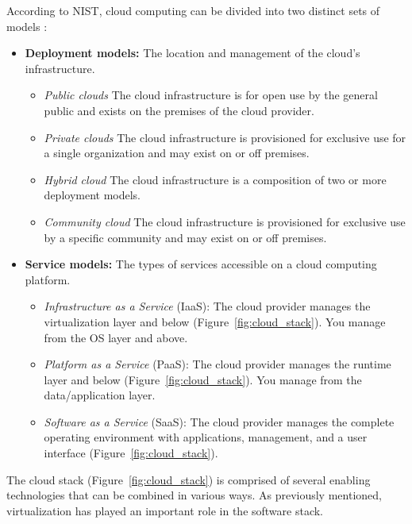 \noindent
According to NIST, cloud computing can be divided into two distinct sets of models \cite[p. 2-3]{nist2011definition}:
\begin{itemize}
    \item \textbf{Deployment models:} The location and management of the cloud's infrastructure. 
        \begin{itemize}
            \setlength\itemsep{0.05em}
            \vspace{-3mm}
            \item \textit{Public clouds} The cloud infrastructure is for open use by the general public and exists on the premises of the cloud provider.
            \item \textit{Private clouds} The cloud infrastructure is provisioned for exclusive use for a single organization and may exist on or off premises.
            \item \textit{Hybrid cloud} The cloud infrastructure is a composition of two or more deployment models.
            \item \textit{Community cloud} The cloud infrastructure is provisioned for exclusive use by a specific community and may exist on or off premises.
        \end{itemize}
    \item \textbf{Service models:} The types of services accessible on a cloud computing platform.
        \begin{itemize}
            \setlength\itemsep{0.05em}
            \vspace{-3mm}
            \item \textit{Infrastructure as a Service} (IaaS): The cloud provider manages the virtualization layer and below (Figure~\ref{fig:cloud_stack}). You manage from the OS layer and above.
            \item \textit{Platform as a Service} (PaaS): The cloud provider manages the runtime layer and below (Figure~\ref{fig:cloud_stack}). You manage from the data/application layer.
            \item \textit{Software as a Service} (SaaS): The cloud provider manages the complete operating environment with applications, management, and a user interface (Figure~\ref{fig:cloud_stack}).
        \end{itemize}
\end{itemize} 

\noindent
The cloud stack (Figure~\ref{fig:cloud_stack}) is comprised of several enabling technologies that can be combined in various ways. As previously mentioned, virtualization has played an important role in the software stack.

